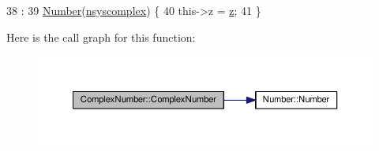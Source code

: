 \begin{DoxyCode}
38                                       :
39     \hyperlink{structNumber_afd3c2f9b4b288e339f741a6e4ae54593}{Number}(\hyperlink{numb_8h_a1475a201d2346881ce88dfbacf628c7da3b38c947375a3db3a4bc184a11c8ee42}{nsyscomplex}) \{
40     this->z = \hyperlink{structComplexNumber_a5f72da71f4ce0d88076a391369239042}{z};
41 \}
\end{DoxyCode}


Here is the call graph for this function\+:
\nopagebreak
\begin{figure}[H]
\begin{center}
\leavevmode
\includegraphics[width=350pt]{db/d8e/structComplexNumber_a0d89581ead93385331befcef51698693_cgraph}
\end{center}
\end{figure}




